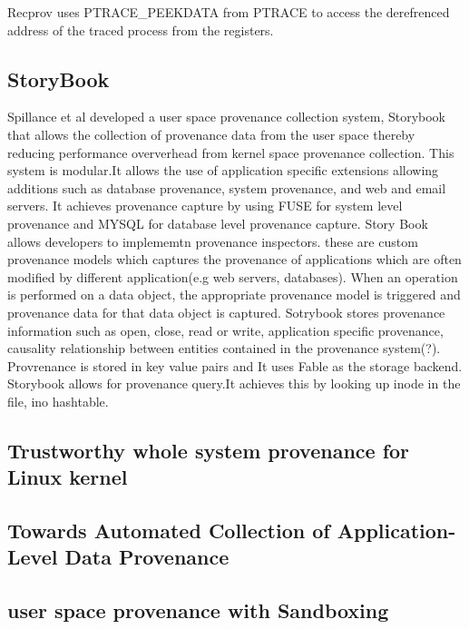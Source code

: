 Recprov uses PTRACE\_PEEKDATA from PTRACE to access the derefrenced address of the traced process from the registers.

\subsection{StoryBook}
Spillance et al developed a user space provenance collection system, Storybook \cite{Rabinovich1995}  that allows the collection of provenance data from the user space thereby reducing performance oververhead from kernel space provenance collection. This system is modular.It allows the use of application specific extensions allowing additions such as database provenance, system provenance, and web and email servers. It achieves provenance capture by using FUSE for system level provenance and MYSQL for database level provenance capture. Story Book allows developers to implememtn provenance inspectors. these are custom provenance models which captures the provenance of applications which are often modified by different application(e.g web servers, databases). When an operation is performed on a data object, the appropriate provenance model is triggered and provenance data for that data object is captured. Sotrybook stores provenance information such as open, close, read or write, application specific provenance, causality relationship between entities contained in the provenance system(?). Provrenance is stored in key value pairs and It uses Fable as the storage backend. Storybook allows for provenance query.It achieves this by looking up inode in the file, ino hashtable.

\subsection{Trustworthy whole system provenance for Linux kernel}

\subsection{Towards Automated Collection of Application-Level Data Provenance}

\subsection{user space provenance with Sandboxing}
\

